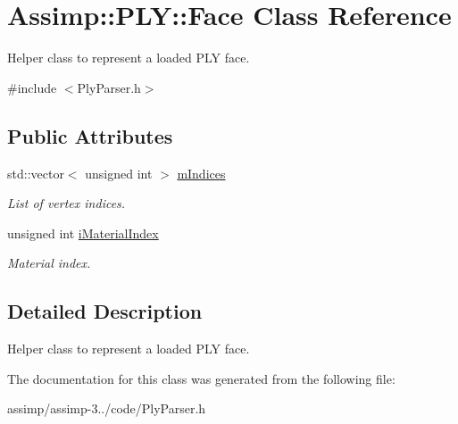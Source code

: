 \hypertarget{class_assimp_1_1_p_l_y_1_1_face}{\section{Assimp\+:\+:P\+L\+Y\+:\+:Face Class Reference}
\label{class_assimp_1_1_p_l_y_1_1_face}
}


Helper class to represent a loaded P\+L\+Y face.  




{\ttfamily \#include $<$Ply\+Parser.\+h$>$}

\subsection*{Public Attributes}
\begin{DoxyCompactItemize}
\item 
\hypertarget{class_assimp_1_1_p_l_y_1_1_face_aa764b2c5688a68f0d981e22c977c1121}{std\+::vector$<$ unsigned int $>$ \hyperlink{class_assimp_1_1_p_l_y_1_1_face_aa764b2c5688a68f0d981e22c977c1121}{m\+Indices}}\label{class_assimp_1_1_p_l_y_1_1_face_aa764b2c5688a68f0d981e22c977c1121}

\begin{DoxyCompactList}\small\item\em List of vertex indices. \end{DoxyCompactList}\item 
\hypertarget{class_assimp_1_1_p_l_y_1_1_face_ad3a2fc9d8d23de89d09cfd7f06e06b8f}{unsigned int \hyperlink{class_assimp_1_1_p_l_y_1_1_face_ad3a2fc9d8d23de89d09cfd7f06e06b8f}{i\+Material\+Index}}\label{class_assimp_1_1_p_l_y_1_1_face_ad3a2fc9d8d23de89d09cfd7f06e06b8f}

\begin{DoxyCompactList}\small\item\em Material index. \end{DoxyCompactList}\end{DoxyCompactItemize}


\subsection{Detailed Description}
Helper class to represent a loaded P\+L\+Y face. 

The documentation for this class was generated from the following file\+:\begin{DoxyCompactItemize}
\item 
assimp/assimp-\/3../code/Ply\+Parser.\+h\end{DoxyCompactItemize}
